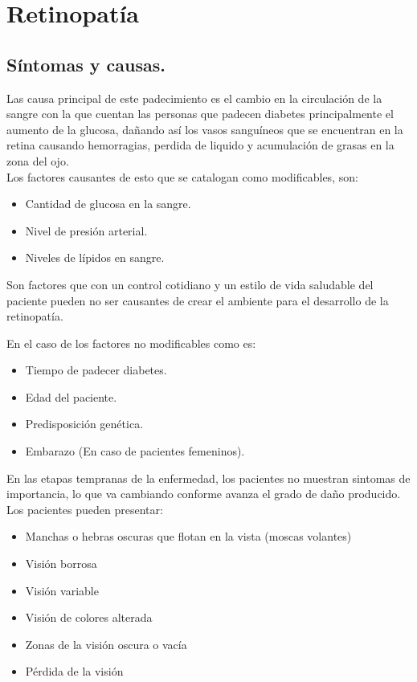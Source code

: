 \documentclass[12pt,letterpaper]{report}
\begin{document}
\section{Retinopatía}\label{cap.retinopatia}
\subsection{Síntomas y causas.}
Las causa principal de este padecimiento es el cambio en la circulación de la sangre con la que cuentan las personas que padecen diabetes principalmente el aumento de la glucosa, dañando así los vasos sanguíneos que se encuentran en la retina causando hemorragias, perdida de liquido y acumulación de grasas en la zona del ojo.\\

Los factores causantes de esto que se catalogan como modificables, son:
\begin{itemize}
\item Cantidad de glucosa en la sangre.
\item Nivel de presión arterial.
\item Niveles de lípidos en sangre.
\end{itemize}
Son factores que con un control cotidiano y un estilo de vida saludable del paciente pueden no ser causantes de crear el ambiente para el desarrollo de la retinopatía.

En el caso de los factores no modificables como es:

\begin{itemize}
\item Tiempo de padecer diabetes.
\item Edad del paciente.
\item Predisposición genética.
\item Embarazo (En caso de pacientes femeninos).
\end{itemize}



En las etapas tempranas de la enfermedad, los pacientes no muestran sintomas de importancia, lo que va cambiando conforme avanza el grado de daño producido.\\

Los pacientes pueden presentar: 
\begin{itemize}
\item Manchas o hebras oscuras que flotan en la vista (moscas volantes)
\item Visión borrosa
\item Visión variable
\item Visión de colores alterada
\item Zonas de la visión oscura o vacía
\item Pérdida de la visión
\end{itemize}
\end{document}
